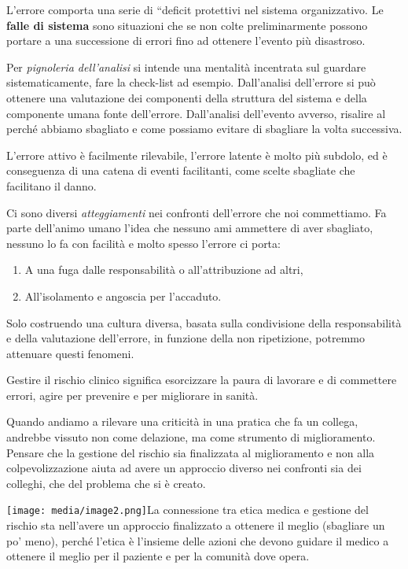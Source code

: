 \documentclass[]{article}
\begin{document}
L'errore comporta una serie di ``deficit protettivi nel sistema
organizzativo. Le \textbf{falle di sistema} sono situazioni che se non
colte preliminarmente possono portare a una successione di errori fino
ad ottenere l'evento più disastroso.

Per \emph{pignoleria dell'analisi} si intende una mentalità incentrata
sul guardare sistematicamente, fare la check-list ad esempio.
Dall'analisi dell'errore si può ottenere una valutazione dei componenti
della struttura del sistema e della componente umana fonte dell'errore.
Dall'analisi dell'evento avverso, risalire al perché abbiamo sbagliato e
come possiamo evitare di sbagliare la volta successiva.

L'errore attivo è facilmente rilevabile, l'errore latente è molto più
subdolo, ed è conseguenza di una catena di eventi facilitanti, come
scelte sbagliate che facilitano il danno.

Ci sono diversi \emph{atteggiamenti} nei confronti dell'errore che noi
commettiamo. Fa parte dell'animo umano l'idea che nessuno ami ammettere
di aver sbagliato, nessuno lo fa con facilità e molto spesso l'errore ci
porta:

\begin{enumerate}
\def\labelenumi{\arabic{enumi}.}
\item
  A una fuga dalle responsabilità o all'attribuzione ad altri,
\item
  All'isolamento e angoscia per l'accaduto.
\end{enumerate}

Solo costruendo una cultura diversa, basata sulla condivisione della
responsabilità e della valutazione dell'errore, in funzione della non
ripetizione, potremmo attenuare questi fenomeni.

Gestire il rischio clinico significa esorcizzare la paura di lavorare e
di commettere errori, agire per prevenire e per migliorare in sanità.

Quando andiamo a rilevare una criticità in una pratica che fa un
collega, andrebbe vissuto non come delazione, ma come strumento di
miglioramento. Pensare che la gestione del rischio sia finalizzata al
miglioramento e non alla colpevolizzazione aiuta ad avere un approccio
diverso nei confronti sia dei colleghi, che del problema che si è
creato.

\texttt{[image: media/image2.png]}La
connessione tra etica medica e gestione del rischio sta nell'avere un
approccio finalizzato a ottenere il meglio (sbagliare un po' meno),
perché l'etica è l'insieme delle azioni che devono guidare il medico a
ottenere il meglio per il paziente e per la comunità dove opera.
\end{document}
